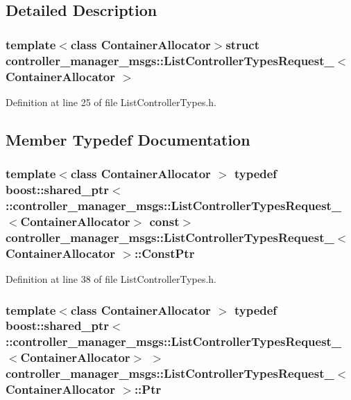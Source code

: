 \subsection{\-Detailed \-Description}
\subsubsection*{template$<$class Container\-Allocator$>$struct controller\-\_\-manager\-\_\-msgs\-::\-List\-Controller\-Types\-Request\-\_\-$<$ Container\-Allocator $>$}



\-Definition at line 25 of file \-List\-Controller\-Types.\-h.



\subsection{\-Member \-Typedef \-Documentation}
\subsubsection[{\-Const\-Ptr}]{\setlength{\rightskip}{0pt plus 5cm}template$<$class Container\-Allocator $>$ typedef boost\-::shared\-\_\-ptr$<$ \-::{\bf controller\-\_\-manager\-\_\-msgs\-::\-List\-Controller\-Types\-Request\-\_\-}$<$\-Container\-Allocator$>$ const$>$ {\bf controller\-\_\-manager\-\_\-msgs\-::\-List\-Controller\-Types\-Request\-\_\-}$<$ \-Container\-Allocator $>$\-::{\bf \-Const\-Ptr}}\label{structcontroller__manager__msgs_1_1ListControllerTypesRequest___a602007d5f18eb255b38ae45fab402742}


\-Definition at line 38 of file \-List\-Controller\-Types.\-h.

\subsubsection[{\-Ptr}]{\setlength{\rightskip}{0pt plus 5cm}template$<$class Container\-Allocator $>$ typedef boost\-::shared\-\_\-ptr$<$ \-::{\bf controller\-\_\-manager\-\_\-msgs\-::\-List\-Controller\-Types\-Request\-\_\-}$<$\-Container\-Allocator$>$ $>$ {\bf controller\-\_\-manager\-\_\-msgs\-::\-List\-Controller\-Types\-Request\-\_\-}$<$ \-Container\-Allocator $>$\-::{\bf \-Ptr}}\label{structcontroller__manager__msgs_1_1ListControllerTypesRequest___a5e1b2972d45249faaab9b11f46697937}


